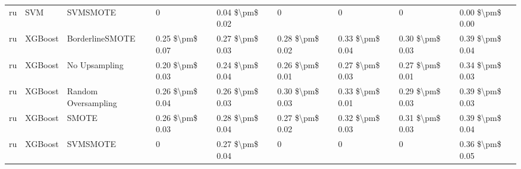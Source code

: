 \begin{tabular}{lllllllll}
      ru &                             SVM &                      SVMSMOTE &               0 &           0.04 \$\textbackslash pm\$ 0.02 &                     0 &                      0 &                                       0 &     0.00 \$\textbackslash pm\$ 0.00 \\
      ru &                         XGBoost &               BorderlineSMOTE & 0.25 \$\textbackslash pm\$ 0.07 &           0.27 \$\textbackslash pm\$ 0.03 &       0.28 \$\textbackslash pm\$ 0.02 &        0.33 \$\textbackslash pm\$ 0.04 &                         0.30 \$\textbackslash pm\$ 0.03 &     0.39 \$\textbackslash pm\$ 0.04 \\
      ru &                         XGBoost &                 No Upsampling & 0.20 \$\textbackslash pm\$ 0.03 &           0.24 \$\textbackslash pm\$ 0.04 &       0.26 \$\textbackslash pm\$ 0.01 &        0.27 \$\textbackslash pm\$ 0.03 &                         0.27 \$\textbackslash pm\$ 0.01 &     0.34 \$\textbackslash pm\$ 0.03 \\
      ru &                         XGBoost &           Random Oversampling & 0.26 \$\textbackslash pm\$ 0.04 &           0.26 \$\textbackslash pm\$ 0.03 &       0.30 \$\textbackslash pm\$ 0.03 &        0.33 \$\textbackslash pm\$ 0.01 &                         0.29 \$\textbackslash pm\$ 0.03 &     0.39 \$\textbackslash pm\$ 0.03 \\
      ru &                         XGBoost &                         SMOTE & 0.26 \$\textbackslash pm\$ 0.03 &           0.28 \$\textbackslash pm\$ 0.04 &       0.27 \$\textbackslash pm\$ 0.02 &        0.32 \$\textbackslash pm\$ 0.03 &                         0.31 \$\textbackslash pm\$ 0.03 &     0.39 \$\textbackslash pm\$ 0.04 \\
      ru &                         XGBoost &                      SVMSMOTE &               0 &           0.27 \$\textbackslash pm\$ 0.04 &                     0 &                      0 &                                       0 &     0.36 \$\textbackslash pm\$ 0.05 \\
\bottomrule
\end{tabular}
